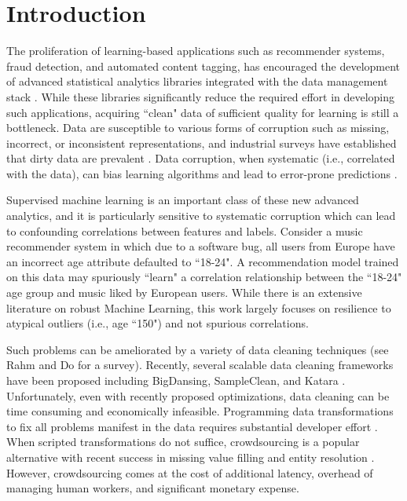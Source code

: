 \section{Introduction}
The proliferation of learning-based applications such as recommender systems, fraud detection, and automated content tagging, has encouraged the development of advanced statistical analytics libraries integrated with the data management stack \cite{bdas, alexandrov2014stratosphere, crotty2014tupleware, hellerstein2012madlib}. 
While these libraries significantly reduce the required effort in developing such applications, acquiring ``clean" data of sufficient quality for learning is still a bottleneck.
Data are susceptible to various forms of corruption such as missing, incorrect, or inconsistent representations, and industrial surveys have established that dirty data are prevalent  \cite{Gartner}.
Data corruption, when systematic \cite{taylor1982introduction} (i.e., correlated with the data), can bias learning algorithms and lead to error-prone predictions \cite{xiaofeature}.

Supervised machine learning is an important class of these new advanced analytics, and it is particularly sensitive to systematic corruption which can lead to confounding correlations between features and labels.
Consider a music recommender system in which due to a software bug, all users from Europe have an incorrect age attribute defaulted to ``18-24".
A recommendation model trained on this data may spuriously ``learn" a correlation relationship between the ``18-24" age group and music liked by European users.
While there is an extensive literature on robust Machine Learning, this work largely focuses on resilience to atypical outliers (i.e., age ``150") and not spurious correlations.

Such problems can be ameliorated by a variety of data cleaning techniques (see Rahm and Do \cite{rahm2000data} for a survey).
Recently, several scalable data cleaning frameworks have been proposed including BigDansing\cite{khayyat2015bigdansing}, SampleClean\cite{sampleclean}, and Katara \cite{chu2015katara}. 
Unfortunately, even with recently proposed optimizations, data cleaning can be time consuming and economically infeasible\cite{wang1999sample}.
Programming data transformations to fix all problems manifest in the data requires substantial developer effort \cite{kandel2012}.
When scripted transformations do not suffice, crowdsourcing is a popular alternative with recent success in missing value filling and entity resolution \cite{gokhale2014corleone, park2014crowdfill, sampleclean,chu2015katara}.
However, crowdsourcing comes at the cost of additional latency, overhead of managing human workers, and significant monetary expense.

